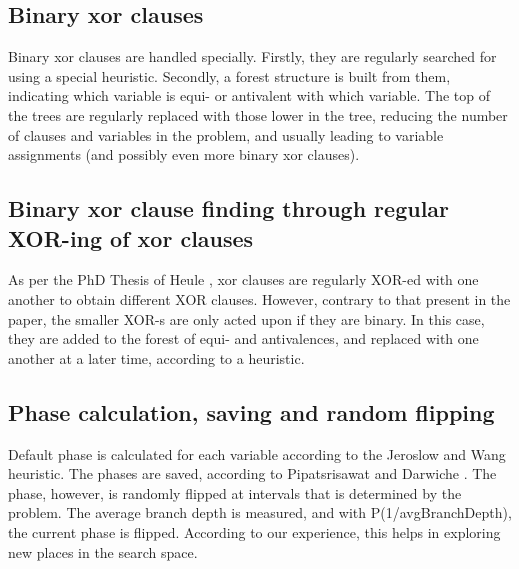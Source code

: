 \documentclass[final]{ieee}
\begin{document}
\subsection{Binary xor clauses}
Binary xor clauses are handled specially. Firstly, they are regularly searched for using a special heuristic. Secondly, a forest structure is built from them, indicating which variable is equi- or antivalent with which variable. The top of the trees are regularly replaced with those lower in the tree, reducing the number of clauses and variables in the problem, and usually leading to variable assignments (and possibly even more binary xor clauses).

\subsection{Binary xor clause finding through regular XOR-ing of xor clauses}
As per the PhD Thesis of Heule \cite{Heule-phd}, xor clauses are regularly XOR-ed with one another to obtain different XOR clauses. However, contrary to that present in the paper, the smaller XOR-s are only acted upon if they are binary. In this case, they are added to the forest of equi- and antivalences, and replaced with one another at a later time, according to a heuristic.

\subsection{Phase calculation, saving and random flipping}
Default phase is calculated for each variable according to the Jeroslow and Wang \cite{DBLP:journals/amai/JeroslowW90} heuristic. The phases are saved, according to Pipatsrisawat and Darwiche \cite{DBLP:conf/sat/PipatsrisawatD07}. The phase, however, is randomly flipped at intervals that is determined by the problem. The average branch depth is measured, and with P(1/avgBranchDepth), the current phase is flipped. According to our experience, this helps in exploring new places in the search space.

\end{document}
